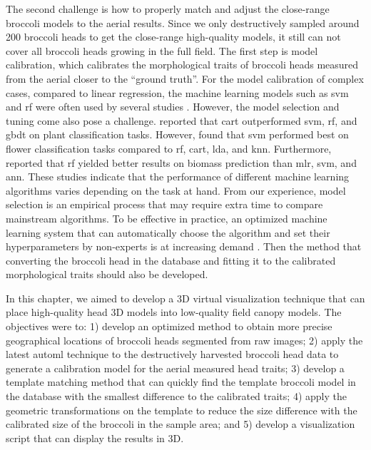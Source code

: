 The second challenge is how to properly match and adjust the close-range broccoli models to the aerial results. Since we only destructively sampled around 200 broccoli heads to get the close-range high-quality models, it still can not cover all broccoli heads growing in the full field. The first step is model calibration, which calibrates the morphological traits of broccoli heads measured from the aerial closer to the ``ground truth''. For the model calibration of complex cases, compared to linear regression, the machine learning models such as \gls{svm} and \gls{rf} were often used by several studies \citep{nguyen_uav_2023, lu_assessment_2022}. However, the model selection and tuning come also pose a challenge. \citet{wang_landscape_2019} reported that \gls{cart} outperformed \gls{svm}, \gls{rf}, and \gls{gbdt} on plant classification tasks. However, \citet{han_drone_2021} found that \gls{svm} performed best on flower classification tasks compared to \gls{rf}, \gls{cart}, \gls{lda}, and \gls{knn}. Furthermore, \citet{han_modeling_2019} reported that \gls{rf} yielded better results on biomass prediction than \gls{mlr}, \gls{svm}, and \gls{ann}. These studies indicate that the performance of different machine learning algorithms varies depending on the task at hand. From our experience, model selection is an empirical process that may require extra time to compare mainstream algorithms. To be effective in practice, an optimized machine learning system that can automatically choose the algorithm and set their hyperparameters by non-experts is at increasing demand \citep{feurer_efficient_2015}. Then the method that converting the broccoli head in the database and fitting it to the calibrated morphological traits should also be developed.

In this chapter, we aimed to develop a 3D virtual visualization technique that can place high-quality head 3D models into low-quality field canopy models. The objectives were to: 1) develop an optimized method to obtain more precise geographical locations of broccoli heads segmented from raw images; 2) apply the latest \gls{automl} technique to the destructively harvested broccoli head data to generate a calibration model for the aerial measured head traits; 3) develop a template matching method that can quickly find the template broccoli model in the database with the smallest difference to the calibrated traits; 4) apply the geometric transformations on the template to reduce the size difference with the calibrated size of the broccoli in the sample area; and 5) develop a visualization script that can display the results in 3D.

